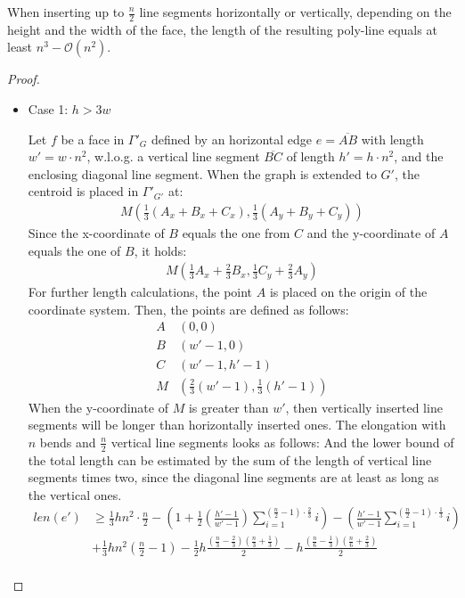 When inserting up to $\frac{n}{2}$ line segments horizontally or vertically, depending on the height and the width of the face, the length of the resulting poly-line equals at least $n^3 - \mathcal{O}(n^2)$.
\begin{proof}
	\begin{itemize}
		\item Case 1: $h > 3w$
		
		Let $f$ be a face in $\Gamma'_G$ defined by an horizontal edge $e = \overline{AB}$ with length $w' = w\cdot n^2$, w.l.o.g. a vertical line segment $\overline{BC}$ of length $h'=h\cdot n^2$, and the enclosing diagonal line segment. When the graph is extended to $G'$, the centroid is placed in $\Gamma'_{G'}$ at:
		\begin{align*}
			M\left(\frac{1}{3}(A_x+B_x+C_x) , \frac{1}{3}(A_y+B_y+C_y) \right)
		\end{align*}
		Since the x-coordinate of $B$ equals the one from $C$ and the y-coordinate of $A$ equals the one of $B$, it holds:
		\begin{align*}
			M\left(\frac{1}{3}A_x+\frac{2}{3}B_x , \frac{1}{3}C_y+\frac{2}{3}A_y \right)
		\end{align*}
		For further length calculations, the point $A$ is placed on the origin of the coordinate system. Then, the points are defined as follows:
		\begin{align*}
			A&(0,0)\\
			B&(w'-1,0)\\
			C&(w'-1,h'-1)\\
			M&\left(\frac{2}{3}(w'-1),\frac{1}{3}(h'-1)\right)
		\end{align*}
		When the y-coordinate of $M$ is greater than $w'$, then vertically inserted line segments will be longer than horizontally inserted ones. The elongation with $n$ bends and $\frac{n}{2}$ vertical line segments looks as follows:
		And the lower bound of the total length can be estimated by the sum of the length of vertical line segments times two, since the diagonal line segments are at least as long as the vertical ones.
		\begin{align}
			len(e') &\geq \frac{1}{3}hn^2\cdot \frac{n}{2}-\left(1+\frac{1}{2}\left(\frac{h'-1}{w'-1}\right)\sum_{i=1}^{\left(\frac{n}{2}-1\right)\cdot\frac{2}{3}}i\right)-\left(\frac{h'-1}{w'-1}\sum_{i=1}^{\left(\frac{n}{2}-1\right)\cdot\frac{1}{3}}i\right)\label{eq:vertical}\\
			&+ \frac{1}{3}hn^2\left(\frac{n}{2}-1\right)-\frac{1}{2}h\frac{\left(\frac{n}{3}-\frac{2}{3}\right)\left(\frac{n}{3}+\frac{1}{3} \right)}{2}-h\frac{\left(\frac{n}{6}-\frac{1}{3}\right)\left(\frac{n}{6}+\frac{2}{3}\right)}{2}\label{eq:vertical-connectors}\\

\end{align}
\end{itemize}
\end{proof}
